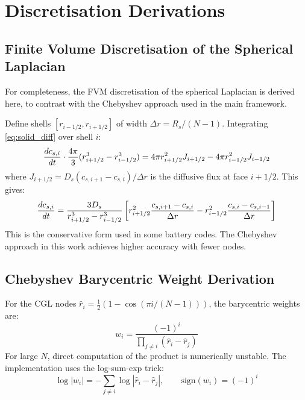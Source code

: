 \chapter{Discretisation Derivations}
\label{app:discretisation}

\section{Finite Volume Discretisation of the Spherical Laplacian}

For completeness, the FVM discretisation of the spherical Laplacian is derived here, to contrast with the Chebyshev approach used in the main framework.

Define shells $[r_{i-1/2}, r_{i+1/2}]$ of width $\Delta r = R_s/(N-1)$. Integrating \cref{eq:solid_diff} over shell $i$:
\begin{equation}
  \dfrac{d c_{s,i}}{dt} \cdot \frac{4\pi}{3}(r_{i+1/2}^3 - r_{i-1/2}^3) = 4\pi r_{i+1/2}^2 J_{i+1/2} - 4\pi r_{i-1/2}^2 J_{i-1/2}
\end{equation}
where $J_{i+1/2} = D_s (c_{s,i+1} - c_{s,i})/\Delta r$ is the diffusive flux at face $i+1/2$. This gives:
\begin{equation}
  \dfrac{d c_{s,i}}{dt} = \frac{3 D_s}{r_{i+1/2}^3 - r_{i-1/2}^3}\left[r_{i+1/2}^2 \frac{c_{s,i+1}-c_{s,i}}{\Delta r} - r_{i-1/2}^2 \frac{c_{s,i}-c_{s,i-1}}{\Delta r}\right]
\end{equation}
This is the conservative form used in some battery codes. The Chebyshev approach in this work achieves higher accuracy with fewer nodes.

\section{Chebyshev Barycentric Weight Derivation}

For the CGL nodes $\hat{r}_i = \frac{1}{2}(1 - \cos(\pi i/(N-1)))$, the barycentric weights are:
\begin{equation}
  w_i = \frac{(-1)^i}{\prod_{j \neq i}(\hat{r}_i - \hat{r}_j)}
\end{equation}
For large $N$, direct computation of the product is numerically unstable. The implementation uses the log-sum-exp trick:
\begin{equation}
  \log|w_i| = -\sum_{j \neq i} \log|\hat{r}_i - \hat{r}_j|, \qquad \text{sign}(w_i) = (-1)^i
\end{equation}

